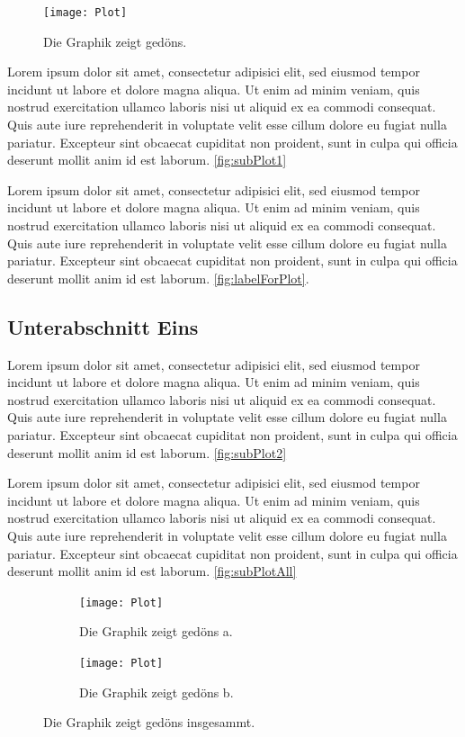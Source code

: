 \begin{figure}
	\centering
	\texttt{[image: Plot]}
	\caption[Kurzbeschreibung]{Die Graphik zeigt gedöns.}
	\label{fig:labelForPlot}
\end{figure}


Lorem ipsum dolor sit amet, consectetur adipisici elit, sed eiusmod tempor incidunt ut labore et dolore magna aliqua. Ut enim ad minim veniam, quis nostrud exercitation ullamco laboris nisi ut aliquid ex ea commodi consequat. Quis aute iure reprehenderit in voluptate velit esse cillum dolore eu fugiat nulla pariatur. Excepteur sint obcaecat cupiditat non proident, sunt in culpa qui officia deserunt mollit anim id est laborum. \autoref{fig:subPlot1} 

Lorem ipsum dolor sit amet, consectetur adipisici elit, sed eiusmod tempor incidunt ut labore et dolore magna aliqua. Ut enim ad minim veniam, quis nostrud exercitation ullamco laboris nisi ut aliquid ex ea commodi consequat. Quis aute iure reprehenderit in voluptate velit esse cillum dolore eu fugiat nulla pariatur. Excepteur sint obcaecat cupiditat non proident, sunt in culpa qui officia deserunt mollit anim id est laborum. \autoref{fig:labelForPlot}.

\subsection{Unterabschnitt Eins}

Lorem ipsum dolor sit amet, consectetur adipisici elit, sed eiusmod tempor incidunt ut labore et dolore magna aliqua. Ut enim ad minim veniam, quis nostrud exercitation ullamco laboris nisi ut aliquid ex ea commodi consequat. Quis aute iure reprehenderit in voluptate velit esse cillum dolore eu fugiat nulla pariatur. Excepteur sint obcaecat cupiditat non proident, sunt in culpa qui officia deserunt mollit anim id est laborum. \autoref{fig:subPlot2}

Lorem ipsum dolor sit amet, consectetur adipisici elit, sed eiusmod tempor incidunt ut labore et dolore magna aliqua. Ut enim ad minim veniam, quis nostrud exercitation ullamco laboris nisi ut aliquid ex ea commodi consequat. Quis aute iure reprehenderit in voluptate velit esse cillum dolore eu fugiat nulla pariatur. Excepteur sint obcaecat cupiditat non proident, sunt in culpa qui officia deserunt mollit anim id est laborum. \autoref{fig:subPlotAll}

\begin{figure}
	\centering
	\begin{subfigure}{.49\textwidth}
		\texttt{[image: Plot]}
		\caption[Kurzbeschreibung]{Die Graphik zeigt gedöns a.}
		\label{fig:subPlot1}
	\end{subfigure}
	\hfill
	\begin{subfigure}{.49\textwidth}
		\texttt{[image: Plot]}
		\caption[Kurzbeschreibung]{Die Graphik zeigt gedöns b.}
		\label{fig:subPlot2}
	\end{subfigure}
	\caption[Kurzbeschreibung Gedöns All]{Die Graphik zeigt gedöns insgesammt.}
	\label{fig:subPlotAll}
\end{figure}

